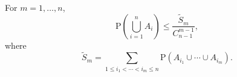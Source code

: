 For $m = 1, \ldots, n$,
$$\text{P}\left(\bigcup_{i=1}^{n} A_i\right) \leq \frac{\tilde{S}_m}{C_{n-1}^{m-1}},$$
where
$$\tilde{S}_m = \sum_{1 \leq i_1 < \cdots < i_m \leq n} \text{P}(A_{i_1} \cup \cdots \cup A_{i_m}).$$
